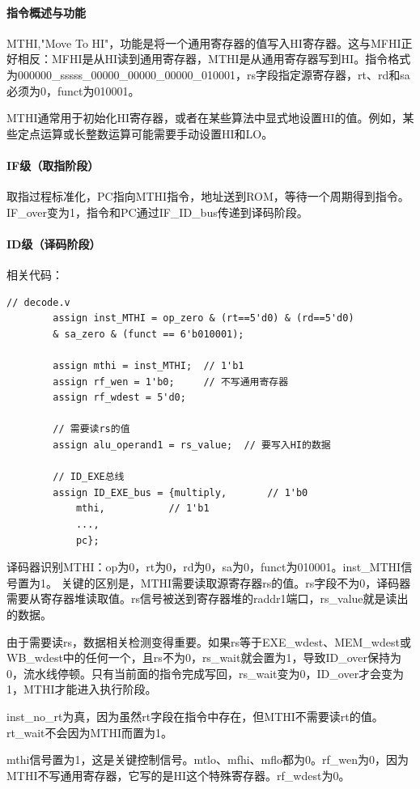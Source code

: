 \documentclass[a4paper]{article}
\begin{document}
	\paragraph{指令概述与功能}
	MTHI,"Move To HI"，功能是将一个通用寄存器的值写入HI寄存器。这与MFHI正好相反：MFHI是从HI读到通用寄存器，MTHI是从通用寄存器写到HI。指令格式为000000\_sssss\_00000\_00000\_00000\_010001，rs字段指定源寄存器，rt、rd和sa必须为0，funct为010001。
	
	MTHI通常用于初始化HI寄存器，或者在某些算法中显式地设置HI的值。例如，某些定点运算或长整数运算可能需要手动设置HI和LO。
	\paragraph{IF级（取指阶段）}
	取指过程标准化，PC指向MTHI指令，地址送到ROM，等待一个周期得到指令。IF\_over变为1，指令和PC通过IF\_ID\_bus传递到译码阶段。
	\paragraph{ID级（译码阶段）}
	相关代码：
	\begin{lstlisting}[caption={ID}]
		// decode.v
		assign inst_MTHI = op_zero & (rt==5'd0) & (rd==5'd0)
		& sa_zero & (funct == 6'b010001);
		
		assign mthi = inst_MTHI;  // 1'b1
		assign rf_wen = 1'b0;     // 不写通用寄存器
		assign rf_wdest = 5'd0;
		
		// 需要读rs的值
		assign alu_operand1 = rs_value;  // 要写入HI的数据
		
		// ID_EXE总线
		assign ID_EXE_bus = {multiply,       // 1'b0
			mthi,           // 1'b1
			...,
			pc};
	\end{lstlisting}
	
	译码器识别MTHI：op为0，rt为0，rd为0，sa为0，funct为010001。inst\_MTHI信号置为1。
	关键的区别是，MTHI需要读取源寄存器rs的值。rs字段不为0，译码器需要从寄存器堆读取值。rs信号被送到寄存器堆的raddr1端口，rs\_value就是读出的数据。
	
	由于需要读rs，数据相关检测变得重要。如果rs等于EXE\_wdest、MEM\_wdest或WB\_wdest中的任何一个，且rs不为0，rs\_wait就会置为1，导致ID\_over保持为0，流水线停顿。只有当前面的指令完成写回，rs\_wait变为0，ID\_over才会变为1，MTHI才能进入执行阶段。
	
	inst\_no\_rt为真，因为虽然rt字段在指令中存在，但MTHI不需要读rt的值。rt\_wait不会因为MTHI而置为1。
	
	mthi信号置为1，这是关键控制信号。mtlo、mfhi、mflo都为0。rf\_wen为0，因为MTHI不写通用寄存器，它写的是HI这个特殊寄存器。rf\_wdest为0。
	
\end{document}
